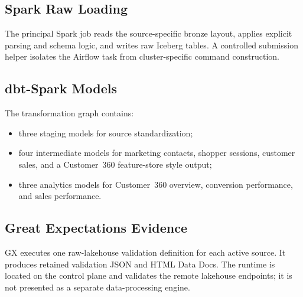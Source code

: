 \subsection{Spark Raw Loading}
The principal Spark job reads the source-specific bronze layout, applies explicit parsing and schema logic, and writes raw Iceberg tables. A controlled submission helper isolates the Airflow task from cluster-specific command construction.

\subsection{dbt-Spark Models}
The transformation graph contains:
\begin{itemize}
    \item three staging models for source standardization;
    \item four intermediate models for marketing contacts, shopper sessions, customer sales, and a Customer~360 feature-store style output;
    \item three analytics models for Customer~360 overview, conversion performance, and sales performance.
\end{itemize}

\subsection{Great Expectations Evidence}
GX executes one raw-lakehouse validation definition for each active source. It produces retained validation JSON and HTML Data Docs. The runtime is located on the control plane and validates the remote lakehouse endpoints; it is not presented as a separate data-processing engine.

